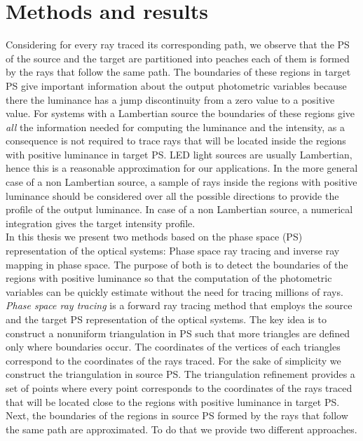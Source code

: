 \section{Methods and results}
Considering for every ray traced its corresponding path, we observe that the PS of the source and the target are partitioned into peaches each of them is formed by the rays that follow the same path. The boundaries of these regions in target PS give important information about the output photometric variables because there the luminance has a jump discontinuity from a zero value to a positive value. For systems with a Lambertian source the boundaries of these regions give \textit{all} the information needed for computing the luminance and the intensity, as a consequence is not required to trace rays that will be located inside the regions with positive luminance in target PS. LED light sources are usually Lambertian, hence this is a reasonable approximation for our applications.
In the more general case of a non Lambertian source, a sample of rays inside the regions with positive luminance should be considered over all the possible directions to provide the profile of the output luminance. In case of a non Lambertian source, a numerical integration gives the target intensity profile. 
\\ \indent 
In this thesis we present two methods based on the phase space (PS) representation of the optical systems: Phase space ray tracing and inverse ray mapping in phase space. The purpose of both is to detect the boundaries of the regions with positive luminance so that the computation of the photometric variables can be quickly estimate without the need for tracing millions of rays. \\ \indent
\textit{Phase space ray tracing} is a forward ray tracing method that employs the source and the target PS representation of the optical systems. The key idea is to construct a nonuniform triangulation in PS such that more triangles are defined only where boundaries occur. The coordinates of the vertices of each triangles correspond to the coordinates of the rays traced.  For the sake of simplicity we construct the triangulation in source PS. The triangulation refinement provides a set of points where every point corresponds to the coordinates of the rays traced that will be located close to the regions with positive luminance in target PS. Next, the boundaries of the regions in source PS formed by the rays that follow the same path are approximated. To do that we provide two different approaches. \\ \indent
